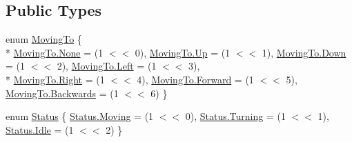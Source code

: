 \subsection*{Public Types}
\begin{DoxyCompactItemize}
\item 
enum \hyperlink{class_g_t_core_1_1_general_1_1_actor_status_aece73cbcbe7407c6f473f67fabdca2af}{Moving\+To} \{ \\*
\hyperlink{class_g_t_core_1_1_general_1_1_actor_status_aece73cbcbe7407c6f473f67fabdca2afa6adf97f83acf6453d4a6a4b1070f3754}{Moving\+To.\+None} = (1 $<$$<$ 0), 
\hyperlink{class_g_t_core_1_1_general_1_1_actor_status_aece73cbcbe7407c6f473f67fabdca2afa258f49887ef8d14ac268c92b02503aaa}{Moving\+To.\+Up} = (1 $<$$<$ 1), 
\hyperlink{class_g_t_core_1_1_general_1_1_actor_status_aece73cbcbe7407c6f473f67fabdca2afa08a38277b0309070706f6652eeae9a53}{Moving\+To.\+Down} = (1 $<$$<$ 2), 
\hyperlink{class_g_t_core_1_1_general_1_1_actor_status_aece73cbcbe7407c6f473f67fabdca2afa945d5e233cf7d6240f6b783b36a374ff}{Moving\+To.\+Left} = (1 $<$$<$ 3), 
\\*
\hyperlink{class_g_t_core_1_1_general_1_1_actor_status_aece73cbcbe7407c6f473f67fabdca2afa92b09c7c48c520c3c55e497875da437c}{Moving\+To.\+Right} = (1 $<$$<$ 4), 
\hyperlink{class_g_t_core_1_1_general_1_1_actor_status_aece73cbcbe7407c6f473f67fabdca2afa67d2f6740a8eaebf4d5c6f79be8da481}{Moving\+To.\+Forward} = (1 $<$$<$ 5), 
\hyperlink{class_g_t_core_1_1_general_1_1_actor_status_aece73cbcbe7407c6f473f67fabdca2afa9d1104e419414f4c268be7211fb8fc4a}{Moving\+To.\+Backwards} = (1 $<$$<$ 6)
 \}
\item 
enum \hyperlink{class_g_t_core_1_1_general_1_1_actor_status_a8a2ef18692e51ef1c72e0a6478ef62e2}{Status} \{ \hyperlink{class_g_t_core_1_1_general_1_1_actor_status_a8a2ef18692e51ef1c72e0a6478ef62e2adefe967ad0373b2274fc298f19125ca7}{Status.\+Moving} = (1 $<$$<$ 0), 
\hyperlink{class_g_t_core_1_1_general_1_1_actor_status_a8a2ef18692e51ef1c72e0a6478ef62e2a52f8e1f874b075c87750fd28311b03e7}{Status.\+Turning} = (1 $<$$<$ 1), 
\hyperlink{class_g_t_core_1_1_general_1_1_actor_status_a8a2ef18692e51ef1c72e0a6478ef62e2ae599161956d626eda4cb0a5ffb85271c}{Status.\+Idle} = (1 $<$$<$ 2)
 \}
\end{DoxyCompactItemize}
